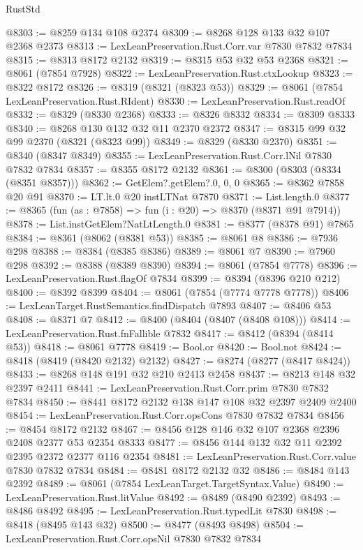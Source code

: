\begin{lexlean}{RustStd}
\begin{coremodule}
@8303 := @8259 @134 @108 @2374
@8309 := @8268 @128 @133 @32 @107 @2368 @2373
@8313 := LexLeanPreservation.Rust.Corr.var @7830 @7832 @7834
@8315 := @8313 @8172 @2132
@8319 := @8315 @53 @32 @53 @2368
@8321 := @8061 (@7854 @7928)
@8322 := LexLeanPreservation.Rust.ctxLookup
@8323 := @8322 @8172
@8326 := @8319 (@8321 (@8323 @53))
@8329 := @8061 (@7854 LexLeanPreservation.Rust.RIdent)
@8330 := LexLeanPreservation.Rust.readOf
@8332 := @8329 (@8330 @2368)
@8333 := @8326 @8332
@8334 := @8309 @8333
@8340 := @8268 @130 @132 @32 @11 @2370 @2372
@8347 := @8315 @99 @32 @99 @2370 (@8321 (@8323 @99))
@8349 := @8329 (@8330 @2370)
@8351 := @8340 (@8347 @8349)
@8355 := LexLeanPreservation.Rust.Corr.lNil @7830 @7832 @7834
@8357 := @8355 @8172 @2132
@8361 := @8300 (@8303 (@8334 (@8351 @8357)))
@8362 := GetElem?.getElem?.{0, 0, 0}
@8365 := @8362 @7858 @20 @91
@8370 := LT.lt.{0} @20 instLTNat @7870
@8371 := List.length.{0}
@8377 := @8365 (fun (as : @7858) => fun (i : @20) => @8370 (@8371 @91 @7914))
@8378 := List.instGetElem?NatLtLength.{0}
@8381 := @8377 (@8378 @91) @7865
@8384 := @8361 (@8062 (@8381 @53))
@8385 := @8061 @8
@8386 := @7936 @298
@8388 := @8384 (@8385 @8386)
@8389 := @8061 @7
@8390 := @7960 @298
@8392 := @8388 (@8389 @8390)
@8394 := @8061 (@7854 @7778)
@8396 := LexLeanPreservation.Rust.flagOf @7834
@8399 := @8394 (@8396 @210 @212)
@8400 := @8392 @8399
@8404 := @8061 (@7854 (@7774 @7778 @7778))
@8406 := LexLeanTarget.RustSemantics.findDispatch @7893
@8407 := @8406 @53
@8408 := @8371 @7
@8412 := @8400 (@8404 (@8407 (@8408 @108)))
@8414 := LexLeanPreservation.Rust.fnFallible @7832
@8417 := @8412 (@8394 (@8414 @53))
@8418 := @8061 @7778
@8419 := Bool.or
@8420 := Bool.not
@8424 := @8418 (@8419 (@8420 @2132) @2132)
@8427 := @8274 (@8277 (@8417 @8424))
@8433 := @8268 @148 @191 @32 @210 @2413 @2458
@8437 := @8213 @148 @32 @2397 @2411
@8441 := LexLeanPreservation.Rust.Corr.prim @7830 @7832 @7834
@8450 := @8441 @8172 @2132 @138 @147 @108 @32 @2397 @2409 @2400
@8454 := LexLeanPreservation.Rust.Corr.opsCons @7830 @7832 @7834
@8456 := @8454 @8172 @2132
@8467 := @8456 @128 @146 @32 @107 @2368 @2396 @2408 @2377 @53 @2354 @8333
@8477 := @8456 @144 @132 @32 @11 @2392 @2395 @2372 @2377 @116 @2354
@8481 := LexLeanPreservation.Rust.Corr.value @7830 @7832 @7834
@8484 := @8481 @8172 @2132 @32
@8486 := @8484 @143 @2392
@8489 := @8061 (@7854 LexLeanTarget.TargetSyntax.Value)
@8490 := LexLeanPreservation.Rust.litValue
@8492 := @8489 (@8490 @2392)
@8493 := @8486 @8492
@8495 := LexLeanPreservation.Rust.typedLit @7830
@8498 := @8418 (@8495 @143 @32)
@8500 := @8477 (@8493 @8498)
@8504 := LexLeanPreservation.Rust.Corr.opsNil @7830 @7832 @7834

\end{coremodule}
\end{lexlean}
